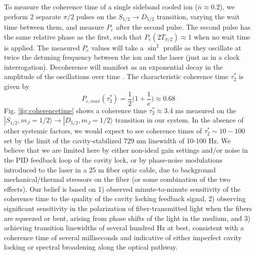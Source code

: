 To measure the coherence time of a single sideband cooled ion ($\bar{n} \approx 0.2$), we perform 2 separate $\pi / 2$ pulses on the $S_{1/2} \rightarrow D_{5/2}$ transition, varying the wait time between them, and measure $P_e$ after the second pulse. The second pulse has the same relative phase as the first, such that $P_e (2 T_{\pi /2}) \approx 1$ when no wait time is applied. The measured $P_e$ values will take a $\sin^2$ profile as they oscillate at twice the detuning frequency between the ion and the laser (just as in a clock interrogation). Decoherence will manifest as an exponential decay in the amplitude of the oscillations over time \cite{PhysRevA.57.3748, SACKETT2003431, RevModPhys.75.715}. The characteristic coherence time $\tau_2^*$ is given by 
\begin{equation}
P_{e,max} (\tau_2^*) = \frac{1}{2} \bigg(1 + \frac{1}{e} \bigg) \approx 0.68
\end{equation}
Fig. \ref{fig:coherencetime} shows a coherence time $\tau_2^* \approx 3.4$ ms measured on the $|S_{1/2}, m_J = 1/2 \rangle \rightarrow |D_{5/2}, m_J = 1/2 \rangle$ transition in our system. In the absence of other systemic factors, we would expect to see coherence times of $\tau_2^* \sim 10-100$ set by the limit of the cavity-stabilized 729 nm linewidth of 10-100 Hz. We believe that we are limited here by either non-ideal gain settings and/or noise in the PID feedback loop \cite{doi:10.1119/1.1286663} of the cavity lock, or by phase-noise modulations introduced to the laser in a 25 m fiber optic cable, due to background mechanical/thermal stressors on the fiber \cite{Ma:94} (or some combination of the two effects). Our belief is based on 1) observed minute-to-minute sensitivity of the coherence time to the quality of the cavity locking feedback signal, 2) observing significant sensitivity in the polarization of fiber-transmitted light when the fibers are squeezed or bent, arising from phase shifts of the light in the medium, and 3) achieving transition linewidths of several hundred Hz at best, consistent with a coherence time of several milliseconds and indicative of either imperfect cavity locking or spectral broadening along the optical pathway. 


